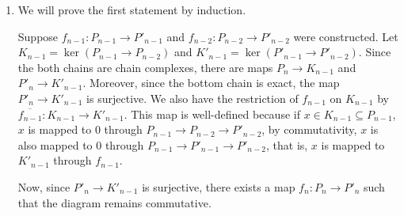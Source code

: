 \documentclass{report}
\begin{document}
\begin{longproof}
\begin{enumerate}
    \item We will prove the first statement by induction. 
    \begin{center}
    \end{center}

    Suppose $f_{n-1}: P_{n-1} \to P'_{n-1}$ and $f_{n-2}: P_{n-2} \to P'_{n-2}$ were constructed. Let $K_{n-1} = \ker (P_{n-1} \to P_{n-2})$ and $K'_{n-1} = \ker (P'_{n-1} \to P'_{n-2})$. Since the both chains are chain complexes, there are maps $P_n \to K_{n-1}$ and $P'_n \to K'_{n-1}$. Moreover, since the bottom chain is exact, the map $P'_n \to K'_{n-1}$ is surjective. We also have the restriction of $f_{n-1}$ on $K_{n-1}$ by $\overline{f_{n-1}}: K_{n-1} \to K'_{n-1}$. This map is well-defined because if $x \in K_{n-1} \subseteq P_{n-1}$, $x$ is mapped to $0$ through $P_{n-1} \to P_{n-2} \to P'_{n-2}$, by commutativity, $x$ is also mapped to $0$ through $P_{n-1} \to P'_{n-1} \to P'_{n-2}$, that is, $x$ is mapped to $K'_{n-1}$ through $f_{n-1}$.

    Now, since $P'_n \to K'_{n-1}$ is surjective, there exists a map $f_n: P_n \to P'_n$ such that the diagram remains commutative.


\end{enumerate}
\end{longproof}
\end{document}
